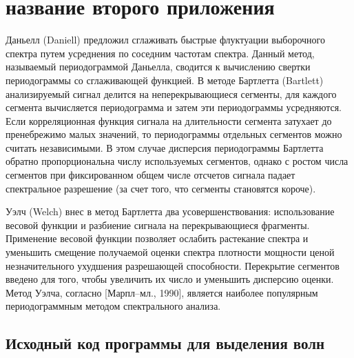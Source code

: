 \chapter{название второго приложения} \label{AppendixB}


Даньелл (Daniell) предложил сглаживать быстрые флуктуации выборочного спектра путем усреднения по соседним частотам спектра. Данный метод, называемый периодограммой Даньелла, сводится к вычислению свертки периодограммы со сглаживающей функцией. В методе Бартлетта (Bartlett) анализируемый сигнал делится на неперекрывающиеся сегменты, для каждого сегмента вычисляется периодограмма и затем эти периодограммы усредняются. Если корреляционная функция сигнала на длительности сегмента затухает до пренебрежимо малых значений, то периодограммы отдельных сегментов можно считать независимыми. В этом случае дисперсия периодограммы Бартлетта обратно пропорциональна числу используемых сегментов, однако с ростом числа сегментов при фиксированном общем числе отсчетов сигнала падает спектральное разрешение (за счет того, что сегменты становятся короче).

Уэлч (Welch) внес в метод Бартлетта два усовершенствования: использование весовой функции и разбиение сигнала на перекрывающиеся фрагменты. Применение весовой функции позволяет ослабить растекание спектра и уменьшить смещение получаемой оценки спектра плотности мощности ценой незначительного ухудшения разрешающей способности. Перекрытие сегментов введено для того, чтобы увеличить их число и уменьшить дисперсию оценки. Метод Уэлча, согласно [Марпл--мл., 1990], является наиболее популярным периодограммным методом спектрального анализа.

 \section{Исходный код программы для выделения волн}\label{AppendixB1}
%